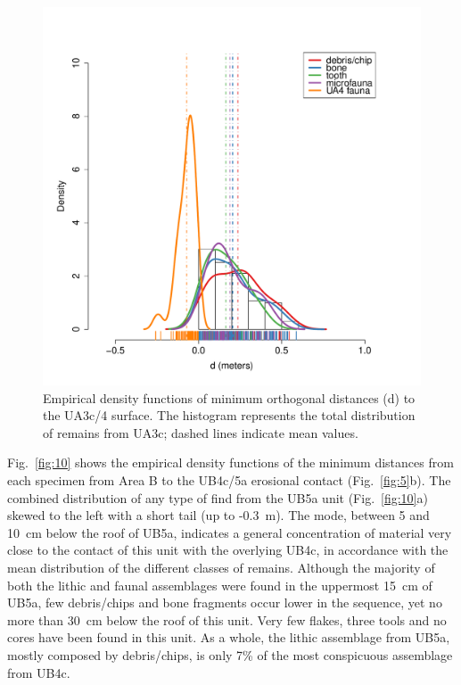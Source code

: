 \documentclass[preprint,authoryear,times]{elsarticle} %
\begin{document}
\begin{figure}[]
  \centering
  \includegraphics[width=.5\textwidth]{../artwork/Fig9.pdf}
  \caption{Empirical density functions of minimum orthogonal distances (d) to the UA3c/4 surface. The histogram represents the total distribution of remains from UA3c; dashed lines indicate mean values.}
  \label{fig:9}
\end{figure}


Fig.~\ref{fig:10} shows the empirical density functions of the minimum distances from each specimen from Area B to the UB4c/5a erosional contact (Fig.~\ref{fig:5}b). The combined distribution of any type of find from the UB5a unit (Fig.~\ref{fig:10}a) skewed to the left with a short tail (up to -0.3~m). The mode, between 5 and 10~cm below the roof of UB5a, indicates a general concentration of material very close to the contact of this unit with the overlying UB4c, in accordance with the mean distribution of the different classes of remains. %
Although the majority of both the lithic and faunal assemblages were found in the uppermost 15~cm of UB5a, few debris/chips and bone fragments occur lower in the sequence, yet no more than 30~cm below the roof of this unit. Very few flakes, three tools and no cores have been found in this unit. As a whole, the lithic assemblage from UB5a, mostly composed by debris/chips, is only 7\% of the most conspicuous assemblage from UB4c.
\end{document}
